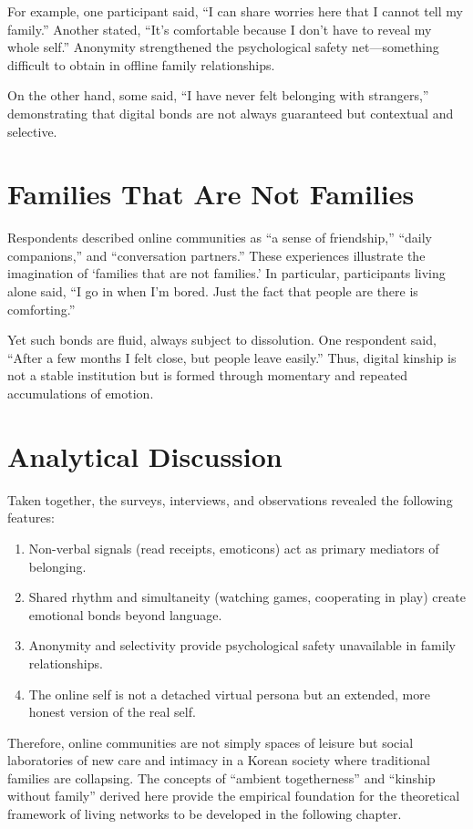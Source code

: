 For example, one participant said, “I can share worries here that I cannot tell my family.” Another stated, “It’s comfortable because I don’t have to reveal my whole self.” Anonymity strengthened the psychological safety net—something difficult to obtain in offline family relationships.  

On the other hand, some said, “I have never felt belonging with strangers,” demonstrating that digital bonds are not always guaranteed but contextual and selective.  


\section{Families That Are Not Families}
Respondents described online communities as “a sense of friendship,” “daily companions,” and “conversation partners.” These experiences illustrate the imagination of ‘families that are not families.’ In particular, participants living alone said, “I go in when I’m bored. Just the fact that people are there is comforting.”  

Yet such bonds are fluid, always subject to dissolution. One respondent said, “After a few months I felt close, but people leave easily.” Thus, digital kinship is not a stable institution but is formed through momentary and repeated accumulations of emotion.


\section{Analytical Discussion}
Taken together, the surveys, interviews, and observations revealed the following features:  

\begin{enumerate}
    \item Non-verbal signals (read receipts, emoticons) act as primary mediators of belonging.
    \item Shared rhythm and simultaneity (watching games, cooperating in play) create emotional bonds beyond language.
    \item Anonymity and selectivity provide psychological safety unavailable in family relationships.
    \item The online self is not a detached virtual persona but an extended, more honest version of the real self.
\end{enumerate}

Therefore, online communities are not simply spaces of leisure but social laboratories of new care and intimacy in a Korean society where traditional families are collapsing. The concepts of “ambient togetherness” and “kinship without family” derived here provide the empirical foundation for the theoretical framework of living networks to be developed in the following chapter.  



